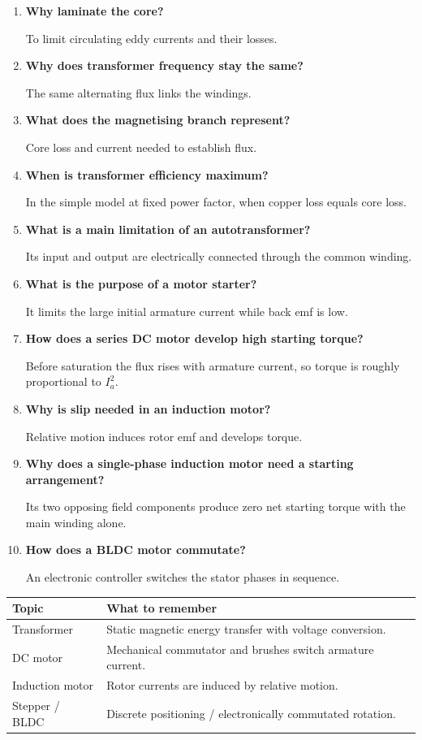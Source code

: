 \documentclass[12pt,a4paper]{article}
\newcommand{\Q}[1]{\textbf{#1}\par\noindent\ignorespaces}
\begin{document}
\begin{tcolorbox}[exambox, title={Frequently Asked / Viva Questions}]
\begin{enumerate}[topsep=0pt, label=\textbf{Q\arabic*.}, itemsep=5pt]
  \item \Q{Why laminate the core?} To limit circulating eddy currents and their losses.
  \item \Q{Why does transformer frequency stay the same?} The same alternating flux links the windings.
  \item \Q{What does the magnetising branch represent?} Core loss and current needed to establish flux.
  \item \Q{When is transformer efficiency maximum?} In the simple model at fixed power factor, when copper loss equals core loss.
  \item \Q{What is a main limitation of an autotransformer?} Its input and output are electrically connected through the common winding.
  \item \Q{What is the purpose of a motor starter?} It limits the large initial armature current while back emf is low.
  \item \Q{How does a series DC motor develop high starting torque?} Before saturation the flux rises with armature current, so torque is roughly proportional to $I_a^2$.
  \item \Q{Why is slip needed in an induction motor?} Relative motion induces rotor emf and develops torque.
  \item \Q{Why does a single-phase induction motor need a starting arrangement?} Its two opposing field components produce zero net starting torque with the main winding alone.
  \item \Q{How does a BLDC motor commutate?} An electronic controller switches the stator phases in sequence.
\end{enumerate}
\end{tcolorbox}

\begin{tcolorbox}[tikzbox, title={Summary Reference}]
\begin{tabularx}{\linewidth}{|B{4.0cm}|Y|}\hline
Topic & \textbf{What to remember} \\ \hline
Transformer & Static magnetic energy transfer with voltage conversion. \\ \hline
DC motor & Mechanical commutator and brushes switch armature current. \\ \hline
Induction motor & Rotor currents are induced by relative motion. \\ \hline
Stepper / BLDC & Discrete positioning / electronically commutated rotation. \\ \hline
\end{tabularx}
\end{tcolorbox}
\end{document}
